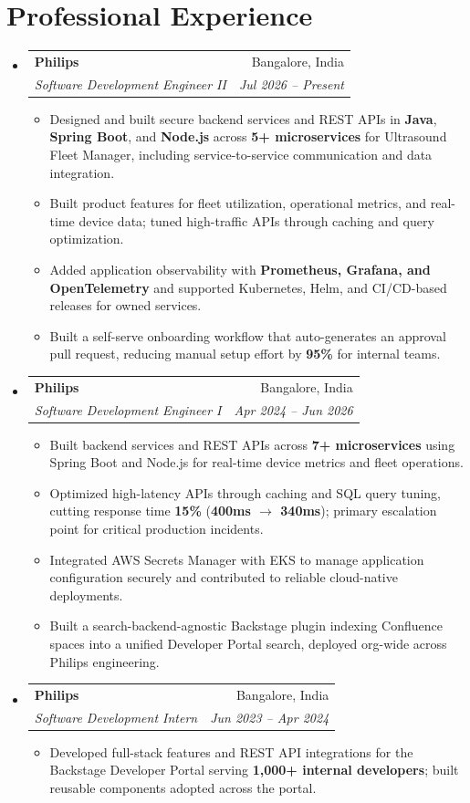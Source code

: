\documentclass[letterpaper,10.5pt]{article}
\makeatletter
\newcommand{\resumeItem}[1]{
  \item\small{#1\vspace{-3pt}}
}
\newcommand{\resumeSubheading}[4]{
  \vspace{-2pt}\item
    \begin{tabular*}{0.97\textwidth}[t]{l@{\extracolsep{\fill}}r}
      \textbf{#1} & \small #2 \\
      \textit{\small#3} & \textit{\small #4} \\
    \end{tabular*}\vspace{-4pt}
}
\newcommand{\resumeSubHeadingListStart}{\begin{itemize}[leftmargin=0.15in, label={}]}
\newcommand{\resumeSubHeadingListEnd}{\end{itemize}}
\newcommand{\resumeItemListStart}{\begin{itemize}[leftmargin=0.2in]\vspace{-2pt}}
\newcommand{\resumeItemListEnd}{\end{itemize}\vspace{-3pt}}
\makeatother
\begin{document}
\section{Professional Experience}
\resumeSubHeadingListStart

  \resumeSubheading
    {Philips}{Bangalore, India}
    {Software Development Engineer II}{Jul 2026 -- Present}
    \resumeItemListStart
      \resumeItem{Designed and built secure backend services and REST APIs in \textbf{Java}, \textbf{Spring Boot}, and \textbf{Node.js} across \textbf{5+ microservices} for Ultrasound Fleet Manager, including service-to-service communication and data integration.}
      \resumeItem{Built product features for fleet utilization, operational metrics, and real-time device data; tuned high-traffic APIs through caching and query optimization.}
      \resumeItem{Added application observability with \textbf{Prometheus, Grafana, and OpenTelemetry} and supported Kubernetes, Helm, and CI/CD-based releases for owned services.}
      \resumeItem{Built a self-serve onboarding workflow that auto-generates an approval pull request, reducing manual setup effort by \textbf{95\%} for internal teams.}
    \resumeItemListEnd

  \resumeSubheading
    {Philips}{Bangalore, India}
    {Software Development Engineer I}{Apr 2024 -- Jun 2026}
    \resumeItemListStart
      \resumeItem{Built backend services and REST APIs across \textbf{7+ microservices} using Spring Boot and Node.js for real-time device metrics and fleet operations.}
      \resumeItem{Optimized high-latency APIs through caching and SQL query tuning, cutting response time \textbf{15\%} (\textbf{400ms $\rightarrow$ 340ms}); primary escalation point for critical production incidents.}
      \resumeItem{Integrated AWS Secrets Manager with EKS to manage application configuration securely and contributed to reliable cloud-native deployments.}
      \resumeItem{Built a search-backend-agnostic Backstage plugin indexing Confluence spaces into a unified Developer Portal search, deployed org-wide across Philips engineering.}
    \resumeItemListEnd

  \resumeSubheading
    {Philips}{Bangalore, India}
    {Software Development Intern}{Jun 2023 -- Apr 2024}
    \resumeItemListStart
      \resumeItem{Developed full-stack features and REST API integrations for the Backstage Developer Portal serving \textbf{1,000+ internal developers}; built reusable components adopted across the portal.}
    \resumeItemListEnd

\resumeSubHeadingListEnd
\end{document}
